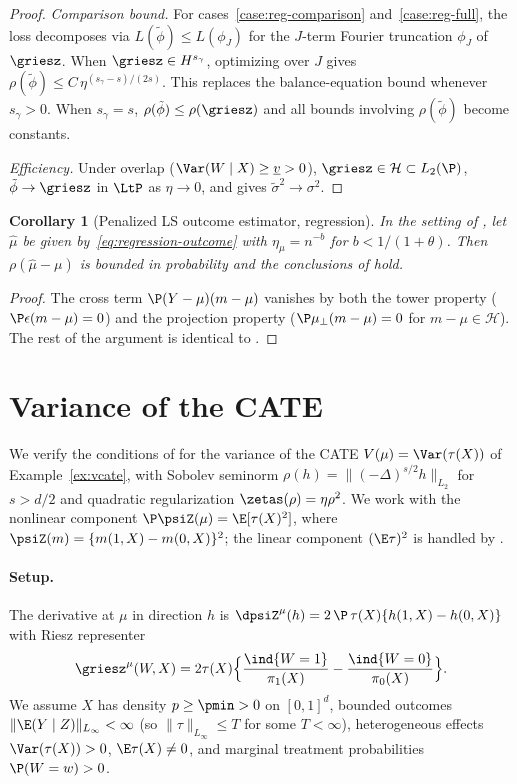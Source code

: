 \documentclass{article}
\newtheorem{corollary}[theorem]{Corollary}
\begin{document}
\begin{proof}
\emph{Comparison bound.}
For cases~\ref{case:reg-comparison}
and~\ref{case:reg-full},
the loss decomposes via
$L(\tilde\phi) \le L(\phi_J)$
for the $J$-term Fourier truncation
$\phi_J$ of $\griesz$.
When $\griesz \in H^{s_\gamma}$,
optimizing over $J$ gives
$\rho(\tilde\phi)
  \le C\,\eta^{(s_\gamma-s)/(2s)}$.
This replaces the balance-equation bound
whenever $s_\gamma > 0$.
When $s_\gamma = s$,
$\rho(\tilde\phi) \le \rho(\griesz)$
and all bounds involving $\rho(\tilde\phi)$
become constants.

\emph{Efficiency.}
Under overlap ($\Var(W \mid X) \ge \underline{v} > 0$),
$\griesz \in \mathcal{H} \subset L_2(\P)$,
$\tilde\phi \to \griesz$ in $\LtP$
as $\eta \to 0$,
and 
gives $\tilde\sigma^2 \to \sigma^2$.
\end{proof}

\begin{corollary}[Penalized LS outcome estimator, regression]
\label{cor:regression-outcome}
In the setting of ,
let $\hat\mu$ be given by~\eqref{eq:regression-outcome}
with $\eta_\mu = n^{-b}$
for $b < 1/(1+\theta)$.
Then $\rho(\hat\mu - \mu)$
is bounded in probability
and the conclusions of
 hold.
\end{corollary}

\begin{proof}
The cross term $\P(Y - \mu)(m - \mu)$
vanishes by both the tower property
($\P\epsilon(m - \mu) = 0$)
and the projection property
($\P\mu_\perp(m - \mu) = 0$
for $m - \mu \in \mathcal{H}$).
The rest of the argument
is identical to
.
\end{proof}

\section{Variance of the CATE}
\label{sec:app-vcate}

We verify the conditions of 
for the variance of the CATE
$V(\mu) = \Var(\tau(X))$
of Example~\ref{ex:vcate},
with Sobolev seminorm $\rho(h) = \|(-\Delta)^{s/2} h\|_{L_2}$
for $s > d/2$ and quadratic regularization
$\zetas(\rho) = \eta \rho^2$.
We work with the nonlinear component
$\P\psiZ(\mu) = \E[\tau(X)^2]$,
where $\psiZ(m) = \{m(1,X) - m(0,X)\}^2$;
the linear component $(\E\tau)^2$
is handled by .

\paragraph{Setup.}
The derivative at $\mu$ in direction $h$ is
$\dpsiZ^\mu(h) = 2\,\P\,\tau(X)\{h(1,X) - h(0,X)\}$
with Riesz representer
\[
\griesz^\mu(W,X)
  = 2\tau(X)
    \qty\Big{\frac{\ind{W=1}}{\pi_1(X)}
         - \frac{\ind{W=0}}{\pi_0(X)}}.
\]
We assume $X$ has density $p \ge \pmin > 0$
on $[0,1]^d$,
bounded outcomes $\|\E(Y \mid Z)\|_{L_\infty} < \infty$
(so $\|\tau\|_{L_\infty} \le T$ for some $T < \infty$),
heterogeneous effects $\Var(\tau(X)) > 0$,
$\E\tau(X) \ne 0$,
and marginal treatment probabilities $\P(W = w) > 0$.
\end{document}
